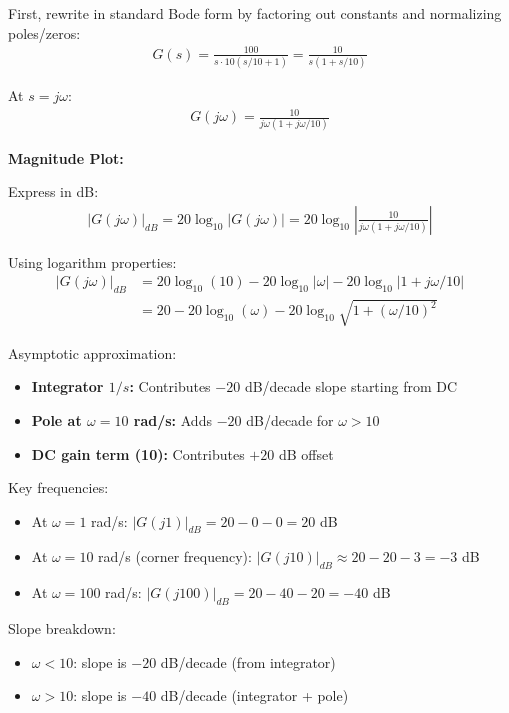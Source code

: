 \documentclass[11pt,a4paper]{article}
\begin{document}
First, rewrite in standard Bode form by factoring out constants and normalizing poles/zeros:
\begin{align}
G(s) = \frac{100}{s \cdot 10(s/10 + 1)} = \frac{10}{s(1 + s/10)}
\end{align}

At $s = j\omega$:
\begin{align}
G(j\omega) = \frac{10}{j\omega(1 + j\omega/10)}
\end{align}

\textbf{Magnitude Plot:}

Express in dB:
\begin{align}
|G(j\omega)|_{dB} = 20\log_{10}|G(j\omega)| = 20\log_{10}\left|\frac{10}{j\omega(1 + j\omega/10)}\right|
\end{align}

Using logarithm properties:
\begin{align}
|G(j\omega)|_{dB} &= 20\log_{10}(10) - 20\log_{10}|\omega| - 20\log_{10}|1 + j\omega/10| \\
&= 20 - 20\log_{10}(\omega) - 20\log_{10}\sqrt{1 + (\omega/10)^2}
\end{align}

Asymptotic approximation:
\begin{itemize}
\item \textbf{Integrator $1/s$:} Contributes $-20$ dB/decade slope starting from DC
\item \textbf{Pole at $\omega = 10$ rad/s:} Adds $-20$ dB/decade for $\omega > 10$
\item \textbf{DC gain term (10):} Contributes $+20$ dB offset
\end{itemize}

Key frequencies:
\begin{itemize}
\item At $\omega = 1$ rad/s: $|G(j1)|_{dB} = 20 - 0 - 0 = 20$ dB
\item At $\omega = 10$ rad/s (corner frequency): $|G(j10)|_{dB} \approx 20 - 20 - 3 = -3$ dB
\item At $\omega = 100$ rad/s: $|G(j100)|_{dB} = 20 - 40 - 20 = -40$ dB
\end{itemize}

Slope breakdown:
\begin{itemize}
\item $\omega < 10$: slope is $-20$ dB/decade (from integrator)
\item $\omega > 10$: slope is $-40$ dB/decade (integrator + pole)
\end{itemize}
\end{document}
